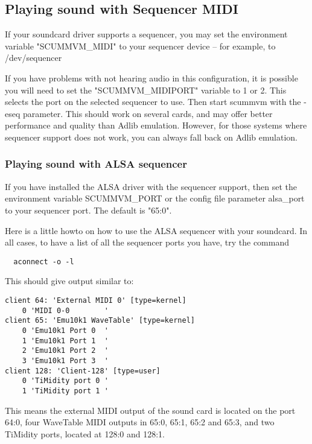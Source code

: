 \subsection{Playing sound with Sequencer MIDI}

If your soundcard driver supports a sequencer, you may set the environment
variable "SCUMMVM\_MIDI" to your sequencer device -- for example, to 
/dev/sequencer

If you have problems with not hearing audio in this configuration, it is
possible you will need to set the "SCUMMVM\_MIDIPORT" variable to 1 or 2. This
selects the port on the selected sequencer to use. Then start scummvm with the
-eseq parameter. This should work on several cards, and may offer better
performance and quality than Adlib emulation. However, for those systems where
sequencer support does not work, you can always fall back on Adlib emulation.


\subsubsection{Playing sound with ALSA sequencer}

If you have installed the ALSA driver with the sequencer support, then
set the environment variable SCUMMVM\_PORT or the config file parameter
alsa\_port to your sequencer port. The default is "65:0".

Here is a little howto on how to use the ALSA sequencer with your soundcard.
In all cases, to have a list of all the sequencer ports you have, try the
command 
\begin{verbatim}
  aconnect -o -l
\end{verbatim}
This should give output similar to:
\begin{verbatim}
client 64: 'External MIDI 0' [type=kernel]
    0 'MIDI 0-0        '
client 65: 'Emu10k1 WaveTable' [type=kernel]
    0 'Emu10k1 Port 0  '
    1 'Emu10k1 Port 1  '
    2 'Emu10k1 Port 2  '
    3 'Emu10k1 Port 3  '
client 128: 'Client-128' [type=user]
    0 'TiMidity port 0 '
    1 'TiMidity port 1 '
\end{verbatim}
%
This means the external MIDI output of the sound card is located on the
port 64:0, four WaveTable MIDI outputs in 65:0, 65:1, 65:2
and 65:3, and two TiMidity ports, located at 128:0 and 128:1.

